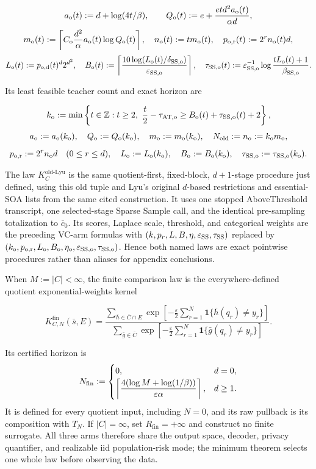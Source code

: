\[
 a_{\rm o}(t):=d+\log(4t/\beta),
 \qquad
 Q_{\rm o}(t):=e+\frac{etd^2a_{\rm o}(t)}{\alpha d},
\]
\[
 m_{\rm o}(t):=\left\lceil C_{\rm o}\frac{d^2}{\alpha}
 a_{\rm o}(t)\log Q_{\rm o}(t)\right\rceil,
 \quad n_{\rm o}(t):=tm_{\rm o}(t),
 \quad p_{\rm o,r}(t):=2^rn_{\rm o}(t)d,
\]
\[
 L_{\rm o}(t):=p_{\rm o,d}(t)^d2^{d^2},
 \quad
 B_{\rm o}(t):=\left\lceil
 \frac{10\log(L_{\rm o}(t)/\delta_{\rm SS,o})}
 {\varepsilon_{\rm SS,o}}
 \right\rceil,
 \quad
 \tau_{\rm SS,o}(t):=\varepsilon_{\rm SS,o}^{-1}
 \log\frac{tL_{\rm o}(t)+1}{\beta_{\rm SS,o}}.
\]

Its least feasible teacher count and exact horizon are

\[
 k_{\rm o}:=\min\left\{t\in\mathbb Z:t\ge2,
 \ \frac t2-\tau_{\rm AT,o}
 \ge B_{\rm o}(t)+\tau_{\rm SS,o}(t)+2\right\},
\]
\[
 a_{\rm o}:=a_{\rm o}(k_{\rm o}),\quad
 Q_{\rm o}:=Q_{\rm o}(k_{\rm o}),\quad
 m_{\rm o}:=m_{\rm o}(k_{\rm o}),\quad
 N_{\rm old}:=n_{\rm o}:=k_{\rm o}m_{\rm o},
\]
\[
 p_{\rm o,r}:=2^rn_{\rm o}d\quad(0\le r\le d),\quad
 L_{\rm o}:=L_{\rm o}(k_{\rm o}),\quad
 B_{\rm o}:=B_{\rm o}(k_{\rm o}),\quad
 \tau_{\rm SS,o}:=\tau_{\rm SS,o}(k_{\rm o}).
\]

The law $K_C^{\mathrm{old\text{-}Lyu}}$ is the same quotient-first,
fixed-block, $d+1$-stage procedure just defined, using this old tuple and
Lyu's original $d$-based restrictions and essential-SOA lists from the
same cited construction.  It uses one stopped AboveThreshold transcript,
one selected-stage Sparse Sample call, and the identical pre-sampling
totalization to $\bar c_0$. Its scores, Laplace scale, threshold, and
categorical weights are the preceding VC-arm formulas with
$(k,p_r,L,B,\eta,\varepsilon_{\rm SS},\tau_{\rm SS})$ replaced by
$(k_{\rm o},p_{\rm o,r},L_{\rm o},B_{\rm o},\eta_{\rm o},
\varepsilon_{\rm SS,o},\tau_{\rm SS,o})$.
Hence both named laws are exact pointwise procedures rather than aliases
for appendix conclusions.

When $M:=|C|<\infty$, the finite comparison law is the everywhere-defined
quotient exponential-weights kernel

\[
K^{\mathrm{fin}}_{C,N}(\bar s,E)=
\frac{\displaystyle\sum_{\bar h\in\bar C\cap E}
 \exp\!\left[-\frac{\varepsilon}{2}\sum_{r=1}^N
 \mathbf1\{\bar h(q_r)\ne y_r\}\right]}
 {\displaystyle\sum_{\bar g\in\bar C}
 \exp\!\left[-\frac{\varepsilon}{2}\sum_{r=1}^N
 \mathbf1\{\bar g(q_r)\ne y_r\}\right]}.
\]

Its certified horizon is
\[
 N_{\rm fin}:=
 \begin{cases}
 0,&d=0,\\[2pt]
 \displaystyle\left\lceil
 \frac{4(\log M+\log(1/\beta))}{\varepsilon\alpha}
 \right\rceil,&d\ge1.
 \end{cases}
\]
It is defined for every quotient input, including $N=0$, and its raw
pullback is its composition with $T_N$.  If $|C|=\infty$, set
$R_{\mathrm{fin}}=+\infty$ and construct no finite surrogate.  All three
arms therefore share the output space, decoder, privacy quantifier, and
realizable iid population-risk mode; the minimum theorem selects one whole
law before observing the data.
